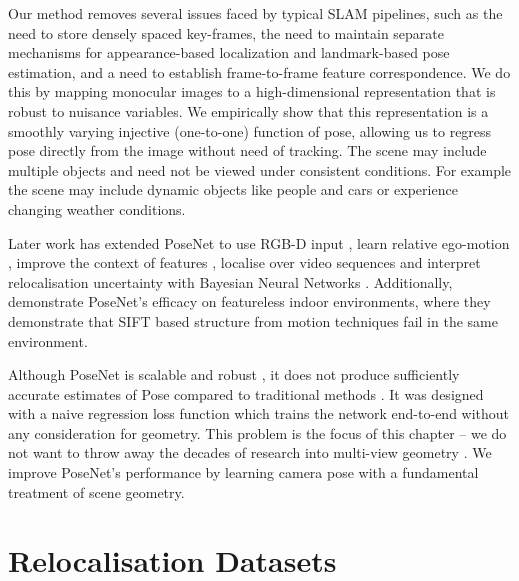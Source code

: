 Our method removes several issues faced by typical SLAM pipelines, such as the need to store densely spaced key-frames, the need to maintain separate mechanisms for appearance-based localization and landmark-based pose estimation, and a need to establish frame-to-frame feature correspondence. We do this by mapping monocular images to a high-dimensional representation that is robust to nuisance variables. We empirically show that this representation is a smoothly varying injective (one-to-one) function of pose, allowing us to regress pose directly from the image without need of tracking. The scene may include multiple objects and need not be viewed under consistent conditions. For example the scene may include dynamic objects like people and cars or experience changing weather conditions. 

Later work has extended PoseNet to use RGB-D input \citep{li2017indoor}, learn relative ego-motion \citep{melekhov2017relative}, improve the context of features \citep{walch2016image}, localise over video sequences \citep{clark2017vidloc} and interpret relocalisation uncertainty with Bayesian Neural Networks \citep{kendall2015modelling}. Additionally, \citep{walch2016image} demonstrate PoseNet's efficacy on featureless indoor environments, where they demonstrate that SIFT based structure from motion techniques fail in the same environment.

Although PoseNet is scalable and robust \citep{kendall2015posenet}, it does not produce sufficiently accurate estimates of Pose compared to traditional methods \citep{Sattler14ECCV}. It was designed with a naive regression loss function which trains the network end-to-end without any consideration for geometry. This problem is the focus of this chapter -- we do not want to throw away the decades of research into multi-view geometry \citep{hartley2000}. We improve PoseNet's performance by learning camera pose with a fundamental treatment of scene geometry.

\section{Relocalisation Datasets}
\label{sec:data}

